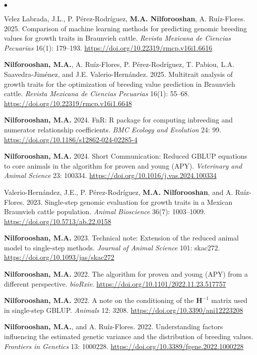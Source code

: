 \documentclass[margin,line]{res}
\newenvironment{list2}{
  \begin{list}{$\bullet$}{%
    \setlength{\itemsep}{0in}
    \setlength{\parsep}{0in} \setlength{\parskip}{0in}
    \setlength{\topsep}{0in} \setlength{\partopsep}{0in}
    \setlength{\leftmargin}{0.2in}}}
  {\end{list}}
\begin{document}
\begin{resume}
  \begin{list2}
    \item Velez Labrada, J.L., P. Pérez-Rodríguez, {\bf M.A. Nilforooshan}, A. Ruíz-Flores. 2025. Comparison of machine learning methods for predicting genomic breeding values for growth traits in Braunvieh cattle. {\em Revista Mexicana de Ciencias Pecuarias} 16(1): 179--193. \url{https://doi.org/10.22319/rmcp.v16i1.6616}
    \item {\bf Nilforooshan, M.A.}, A. Ruíz-Flores, P. Pérez-Rodríguez, T. Pabiou, L.A. Saavedra-Jiménez, and J.E. Valerio-Hernández. 2025. Multitrait analysis of growth traits for the optimization of breeding value prediction in Braunvieh cattle. {\em Revista Mexicana de Ciencias Pecuarias} 16(1): 55--68. \url{https://doi.org/10.22319/rmcp.v16i1.6648}
    \item {\bf Nilforooshan, M.A.} 2024. FnR: R package for computing inbreeding and numerator relationship coefficients. {\em BMC Ecology and Evolution} 24: 99. \url{https://doi.org/10.1186/s12862-024-02285-4}
    \item {\bf Nilforooshan, M.A.} 2024. Short Communication: Reduced GBLUP equations to core animals in the algorithm for proven and young (APY). {\em Veterinary and Animal Science} 23: 100334. \url{https://doi.org/10.1016/j.vas.2024.100334}
    \item Valerio-Hernández, J.E., P. Pérez-Rodríguez, {\bf M.A. Nilforooshan}, and A. Ruíz-Flores. 2023. Single-step genomic evaluation for growth traits in a Mexican Braunvieh cattle population. {\em Animal Bioscience} 36(7): 1003--1009. \url{https://doi.org/10.5713/ab.22.0158}
    \item {\bf Nilforooshan, M.A.} 2023. Technical note: Extension of the reduced animal model to single-step methods. {\em Journal of Animal Science} 101: skac272. \url{https://doi.org/10.1093/jas/skac272}
    \item {\bf Nilforooshan, M.A.} 2022. The algorithm for proven and young (APY) from a different perspective. {\em bioRxiv}. \url{https://doi.org/10.1101/2022.11.23.517757}
    \item {\bf Nilforooshan, M.A.} 2022. A note on the conditioning of the $\mathbf H^{-1}$ matrix used in single-step GBLUP. {\em Animals} 12: 3208. \url{https://doi.org/10.3390/ani12223208}
    \item {\bf Nilforooshan, M.A.}, and A. Ruíz-Flores. 2022. Understanding factors influencing the estimated genetic variance and the distribution of breeding values. {\em Frontiers in Genetics} 13: 1000228. \url{https://doi.org/10.3389/fgene.2022.1000228}

\end{list2}
\end{resume}
\end{document}
